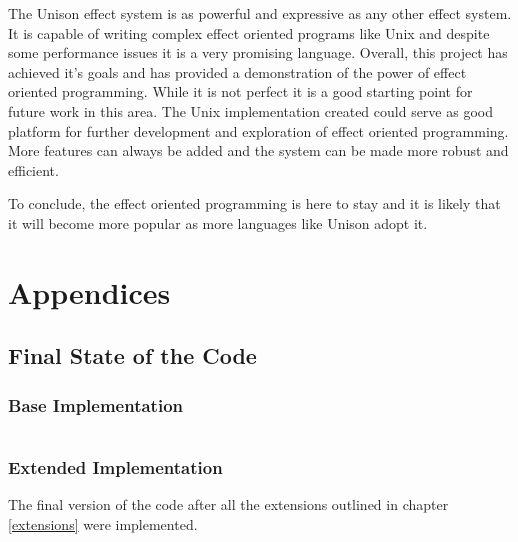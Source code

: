 \documentclass[logo,bsc,singlespacing,parskip]{infthesis}
\begin{document}
The Unison effect system is as powerful and expressive as any other effect
system. It is capable of writing complex effect oriented programs like Unix and 
despite some performance issues it is a very promising language. Overall, this project 
has achieved it's goals and has provided a demonstration of the power of effect
oriented programming. While it is not perfect it is a good starting point for future
work in this area.
The Unix implementation created could serve as good platform for further
development and exploration of effect oriented programming. More features 
can always be added and the system can be made more robust and efficient.

To conclude, the effect oriented programming is here to stay and it is likely
that it will become more popular as more languages like Unison adopt it. 

\part{Appendices}

\chapter{Final State of the Code}

\section{Base Implementation}

\begin{lstlisting}[language=unison]
\end{lstlisting}

\section{Extended Implementation}

The final version of the code after all the extensions outlined in chapter \ref{extensions} were implemented.
\end{document}
